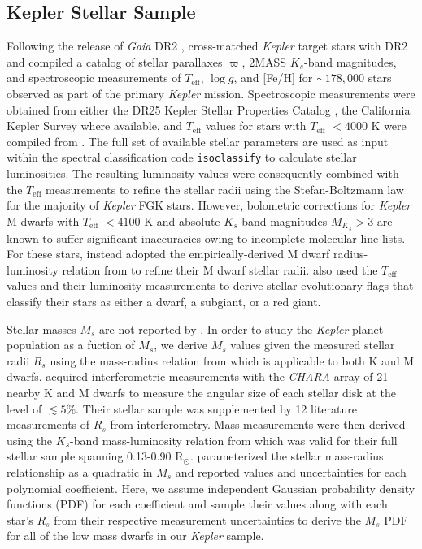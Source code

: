 \documentclass[twocolumn]{emulateapj}
\newcommand{\gaia}[1]{\emph{Gaia}#1}
\newcommand{\kepler}[1]{\emph{Kepler}#1}
\newcommand{\teff}[1]{$T_{\text{eff}}$#1}
\newcommand{\logg}[1]{$\log{g}$#1}
\begin{document}
\subsection{Kepler Stellar Sample} \label{sect:kep}
Following the release of \gaia{} DR2 \citep{lindegren18}, \cite{berger18} cross-matched \kepler{} target stars
with DR2 and compiled a catalog of stellar
parallaxes $\varpi$, 2MASS $K_s$-band magnitudes, and spectroscopic measurements of \teff{,} \logg{,} and [Fe/H]
for $\sim 178,000$ stars observed as part of the primary \kepler{} mission. Spectroscopic measurements were obtained from
either the DR25
Kepler Stellar Properties Catalog \citep[KSPC;][]{mathur17}, the California
Kepler Survey \citep[CKS;][]{petigura17} where available, and \teff{} values for stars with \teff{} $<4000$ K were compiled from
\cite{gaidos16}. The full set of available stellar parameters are used as input within the spectral classification code
\texttt{isoclassify} \citep{huber17} to calculate stellar luminosities. The resulting luminosity values were consequently combined
with the \teff{} measurements to refine the stellar radii using the Stefan-Boltzmann law for the majority of \kepler{} FGK stars.
However, bolometric corrections for \kepler{} M dwarfs with \teff{} $<4100$ K
and absolute $K_s$-band magnitudes $M_{K_s}>3$ are known to suffer significant inaccuracies owing to incomplete
molecular line lists. For these stars, \cite{berger18} instead adopted the empirically-derived M dwarf radius-luminosity
relation from \cite{mann15} to refine their M dwarf stellar radii. \cite{berger18} also used the \teff{} values and their
luminosity measurements to derive stellar evolutionary flags that classify their stars as either a dwarf, a subgiant, or a
red giant.

Stellar masses $M_s$ are not reported by \cite{berger18}. In order to study the \kepler{} planet population as a fuction of $M_s$,
we derive $M_s$ values given the measured stellar radii $R_s$ using the mass-radius relation from \cite{boyajian12} which is
applicable to both K and M dwarfs.
\cite{boyajian12} acquired interferometric measurements with the \emph{CHARA} array of 21 nearby K and M dwarfs
to measure the angular size of each stellar disk at the level of $\lesssim 5$\%. Their stellar sample was supplemented by 12
literature measurements of $R_s$ from interferometry. Mass measurements were then derived using the $K_s$-band mass-luminosity
relation from \cite{henry93} which was valid for their full stellar sample spanning 0.13-0.90 R$_{\odot}$. \cite{boyajian12}
parameterized the stellar mass-radius relationship as a quadratic in $M_s$ and reported values and uncertainties for each polynomial
coefficient. Here, we assume independent Gaussian probability density functions (PDF) for each coefficient and sample their values
along with each star's $R_s$ from their respective measurement uncertainties to derive the $M_s$ PDF for all of the low mass dwarfs
in our \kepler{} sample.
\end{document}
